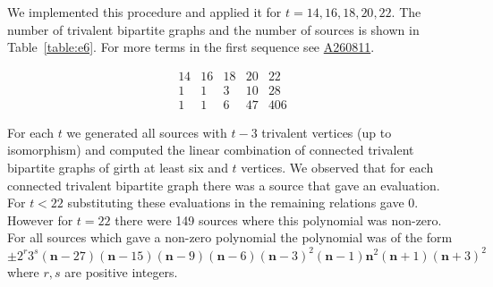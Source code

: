\documentclass[12pt]{amsart}
\newcommand{\oeis}[1]{\href{https://oeis.org/#1}{#1}}
\newcommand\nn{\mathbf{n}}
\begin{document}
We implemented this procedure and applied it for $t=14,16,18,20,22$. The number of trivalent bipartite
graphs and the number of sources is shown in Table~\ref{table:e6}. For more terms in the
first sequence see \oeis{A260811}.
\begin{table}[h]
	\begin{equation*}
		\begin{array}{rrrrr}
			14 & 16 & 18 & 20 & 22 \\ \hline
			1 & 1 & 3 & 10 & 28 \\
			1 & 1 & 6 & 47 & 406
		\end{array}
	\end{equation*}
	\caption{Trivalent graphs and sources}\label{table:e6}
\end{table}
For each $t$ we generated all sources
with $t-3$ trivalent vertices (up to isomorphism) and computed the linear combination of
connected trivalent bipartite graphs of girth at least six and $t$ vertices. We observed that for each 
connected trivalent bipartite graph there was a source that gave an evaluation. For $t<22$ substituting these
evaluations in the remaining relations gave 0. However for $t=22$ there were 149 sources where this polynomial
was non-zero. For all sources which gave a non-zero polynomial the polynomial was of the form
\[ \pm 2^r 3^s (\nn - 27) (\nn - 15) (\nn - 9) (\nn - 6)(\nn - 3)^2(\nn - 1)\nn^2 (\nn + 1) (\nn + 3)^2 \]
where $r,s$ are positive integers.





\end{document}
